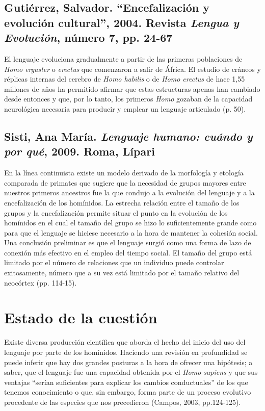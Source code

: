 \documentclass[12pt, a4paper, oneside]{report}
\begin{document}
                \subsection*{Gutiérrez, Salvador. “Encefalización y evolución cultural”, 2004. Revista
                \textit{Lengua y Evolución}, número 7, pp. 24-67}
                    El lenguaje evoluciona gradualmente a partir de las primeras poblaciones de
                    \emph{Homo ergaster} o \emph{erectus} que comenzaron a salir de África. El estudio de
                    cráneos y réplicas internas del cerebro de \emph{Homo habilis} o de
                    \emph{Homo erectus} de hace 1,55 millones de años ha permitido afirmar que estas
                    estructuras apenas han cambiado desde entonces y que, por lo tanto, los primeros
                    \emph{Homo} gozaban de la capacidad neurológica necesaria para producir y emplear un
                    lenguaje articulado (p. 50).

                \subsection*{Sisti, Ana María. \textit{Lenguaje humano: cuándo y por qué}, 2009. Roma, Lípari}
                    En la línea continuista existe un modelo derivado de la morfología y etología comparada de
                    primates que sugiere que la necesidad de grupos mayores entre nuestros primeros ancestros
                    fue la que condujo a la evolución del lenguaje y a la encefalización de los homínidos. La
                    estrecha relación entre el tamaño de los grupos y la encefalización permite situar el
                    punto en la evolución de los homínidos en el cual el tamaño del grupo se hizo lo
                    suficientemente grande como para que el lenguaje se hiciese necesario a la hora de
                    mantener la cohesión social. Una conclusión preliminar es que el lenguaje surgió como una
                    forma de lazo de conexión más efectivo en el empleo del tiempo social. El tamaño del grupo
                    está limitado por el número de relaciones que un individuo puede controlar exitosamente,
                    número que a su vez está limitado por el tamaño relativo del neocórtex (pp. 114-15).
                    \clearpage

        \section{Estado de la cuestión}
            Existe diversa producción científica que aborda el hecho del inicio del uso del lenguaje por
            parte de los homínidos. Haciendo una revisión en profundidad se puede inferir que hay dos grandes
            posturas a la hora de ofrecer una hipótesis; a saber, que el lenguaje fue una capacidad obtenida
            por el \emph{Homo sapiens} y que sus ventajas ``serían suficientes para explicar los cambios
            conductuales'' de los que tenemos conocimiento o que, sin embargo, forma parte de un proceso
            evolutivo procedente de las especies que nos precedieron (Campos, 2003, pp.124-125).
\end{document}
